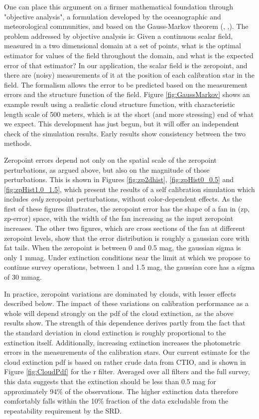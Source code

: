 \documentclass[12pt,preprint]{aastex}
\begin{document}
One can place this argument on a firmer mathematical foundation through "objective analysis", a formulation developed by the 
oceanographic and meteorological communities, and based on the Gauss-Markov theorem (\citep{Bretherton1976}, 
\citep{Bretherton1980},\citep{McIntosh1990}).
The problem addressed by objective analysis is:  Given a continuous scalar field, measured in a two dimensional domain at a set of 
points, what is the optimal estimator for values of the field throughout the domain, and what is the expected error of that estimator?
In our application, the scalar field is the zeropoint, and there are (noisy) measurements of it at the position of each calibration
star in the field.  The formalism allows the error to be predicted based on the measurement errors and the structure function
of the field.  Figure \ref{fig:GaussMarkov} shows an example result using a realistic cloud structure function, with 
characteristic length scale of 500 meters, which is at the short (and more stressing) end of what we expect.  This development
has just begun, but it will offer an independent check of the simulation results.  Early results show consistency between
the two methods.


Zeropoint errors depend not only on the spatial scale of the zeropoint perturbations, as argued above,
but also on the magnitude of those perturbations.   This is shown in Figures \ref{fig:zp2dhist}, \ref{fig:zpHist0_0.5} and 
\ref{fig:zpHist1.0_1.5}, which present
the results of a self calibration simulation which includes {\it only} zeropoint perturbations, without
color-dependent effects.  As the first of these figures illustrates, the zeropoint error has the shape of a fan
in (zp, zp-error) space, with the width of the fan increasing as the input zeropoint increases.  The other two
figures, which are cross sections of the fan at different zeropoint levels, show that the error distribution
is roughly a gaussian core with fat tails.  When the zeropoint is between 0 and 0.5 mag, the gaussian sigma is only
1 mmag.  Under extinction conditions near the limit at which we propose to continue survey operations, between
1 and 1.5 mag, the gaussian core has a sigma of 30 mmag.

In practice, zeropoint variations are dominated by clouds, with lesser effects described below.
The impact of these variations on calibration performance as a whole will depend strongly on
the pdf of the cloud extinction, as the above results show.  The strength of this dependence derives partly from the fact that
the standard deviation in cloud extinction is roughly proportional to the extinction itself.  Additionally, 
increasing extinction increases the photometric errors in the measurements of the
calibration stars.  Our current estimate for the cloud extinction pdf is based on rather crude data from CTIO, and is shown in Figure
\ref{fig:CloudPdf} for the r filter.  Averaged over all filters and the full survey, this data suggests that the extinction should be 
less than 0.5 mag for approximately 94\% of the observations.
The higher extinction data therefore comfortably falls within the 10\% fraction of the data excludable
from the repeatability requirement by the SRD.
\end{document}
